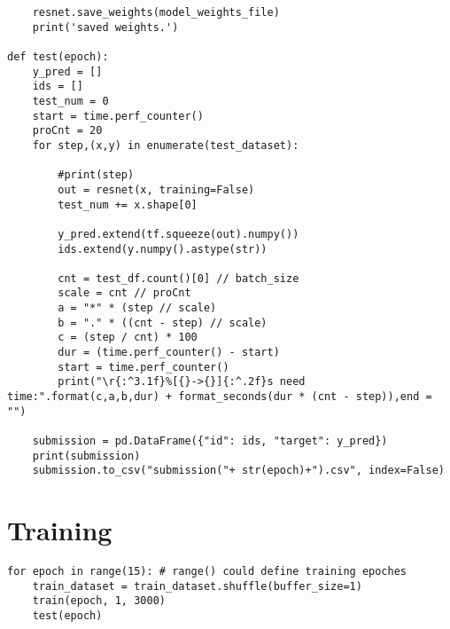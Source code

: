 \begin{verbatim}
    resnet.save_weights(model_weights_file)
    print('saved weights.')

def test(epoch):
    y_pred = []
    ids = []
    test_num = 0
    start = time.perf_counter()
    proCnt = 20
    for step,(x,y) in enumerate(test_dataset):

        #print(step)
        out = resnet(x, training=False)
        test_num += x.shape[0]

        y_pred.extend(tf.squeeze(out).numpy())
        ids.extend(y.numpy().astype(str))

        cnt = test_df.count()[0] // batch_size
        scale = cnt // proCnt
        a = "*" * (step // scale)
        b = "." * ((cnt - step) // scale)
        c = (step / cnt) * 100
        dur = (time.perf_counter() - start)
        start = time.perf_counter()
        print("\r{:^3.1f}%[{}->{}]{:^.2f}s need time:".format(c,a,b,dur) + format_seconds(dur * (cnt - step)),end = "")

    submission = pd.DataFrame({"id": ids, "target": y_pred})
    print(submission)
    submission.to_csv("submission("+ str(epoch)+").csv", index=False)
\end{verbatim}

\section{Training}

\begin{verbatim}
for epoch in range(15): # range() could define training epoches
    train_dataset = train_dataset.shuffle(buffer_size=1)
    train(epoch, 1, 3000)
    test(epoch)
\end{verbatim}
